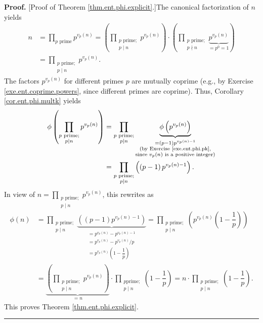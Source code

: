 \documentclass[numbers=enddot,12pt,final,onecolumn,notitlepage]{scrartcl}%
\numberwithin{exer}{subsection}
\theoremstyle{definition}
\newenvironment{proof}[1][Proof]{\noindent\textbf{#1.} }{\ \rule{0.5em}{0.5em}}
\let\prodnonlimits\prod
\renewcommand{\prod}{\prodnonlimits\limits}
\begin{document}
\begin{proof}
[Proof of Theorem \ref{thm.ent.phi.explicit}.]The canonical factorization of
$n$ yields%
\begin{align*}
n  &  =\prod_{p\text{ prime}}p^{v_{p}\left(  n\right)  }=\left(
\prod_{\substack{p\text{ prime;}\\p\mid n}}p^{v_{p}\left(  n\right)  }\right)
\cdot\left(  \prod_{\substack{p\text{ prime;}\\p\nmid n}}\underbrace{p^{v_{p}%
\left(  n\right)  }}_{=p^{0}=1}\right) \\
&  =\prod_{\substack{p\text{ prime;}\\p\mid n}}p^{v_{p}\left(  n\right)  }.
\end{align*}
The factors $p^{v_{p}\left(  n\right)  }$ for different primes $p$ are
mutually coprime (e.g., by Exercise \ref{exe.ent.coprime.powers}, since
different primes are coprime). Thus, Corollary \ref{cor.ent.phi.multk} yields%
\begin{align*}
\phi\left(  \prod_{\substack{p\text{ prime;}\\p\mid n}}p^{v_{p}\left(
n\right)  }\right)   &  =\prod_{\substack{p\text{ prime;}\\p\mid
n}}\underbrace{\phi\left(  p^{v_{p}\left(  n\right)  }\right)  }%
_{\substack{=\left(  p-1\right)  p^{v_{p}\left(  n\right)  -1}\\\text{(by
Exercise \ref{exe.ent.phi.pk},}\\\text{since }v_{p}\left(  n\right)  \text{ is
a positive integer)}}}\\
&  =\prod_{\substack{p\text{ prime;}\\p\mid n}}\left(  \left(  p-1\right)
p^{v_{p}\left(  n\right)  -1}\right)  .
\end{align*}
In view of $n=\prod_{\substack{p\text{ prime;}\\p\mid n}}p^{v_{p}\left(
n\right)  }$, this rewrites as%
\begin{align*}
\phi\left(  n\right)   &  =\prod_{\substack{p\text{ prime;}\\p\mid
n}}\underbrace{\left(  \left(  p-1\right)  p^{v_{p}\left(  n\right)
-1}\right)  }_{\substack{=p^{v_{p}\left(  n\right)  }-p^{v_{p}\left(
n\right)  -1}\\=p^{v_{p}\left(  n\right)  }-p^{v_{p}\left(  n\right)
}/p\\=p^{v_{p}\left(  n\right)  }\left(  1-\dfrac{1}{p}\right)  }%
}=\prod_{\substack{p\text{ prime;}\\p\mid n}}\left(  p^{v_{p}\left(  n\right)
}\left(  1-\dfrac{1}{p}\right)  \right) \\
&  =\underbrace{\left(  \prod_{\substack{p\text{ prime;}\\p\mid n}%
}p^{v_{p}\left(  n\right)  }\right)  }_{=n}\cdot\prod_{\substack{p\text{
prime;}\\p\mid n}}\left(  1-\dfrac{1}{p}\right)  =n\cdot\prod
_{\substack{p\text{ prime;}\\p\mid n}}\left(  1-\dfrac{1}{p}\right)  .
\end{align*}
This proves Theorem \ref{thm.ent.phi.explicit}.
\end{proof}
\end{document}
